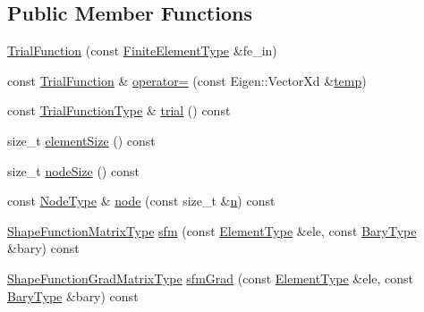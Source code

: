 \subsection*{Public Member Functions}
\begin{DoxyCompactItemize}
\item 
\hyperlink{classmodel_1_1_trial_function_ae27e9c128c6fca2c9a7e89b7b8e4849f}{Trial\+Function} (const \hyperlink{classmodel_1_1_trial_function_affdabe3315d0208c9b2210c3cbee6d42}{Finite\+Element\+Type} \&fe\+\_\+in)
\item 
const \hyperlink{classmodel_1_1_trial_function}{Trial\+Function} \& \hyperlink{classmodel_1_1_trial_function_abf1af5b4cf7edf2e9f1b054b6b196bdf}{operator=} (const Eigen\+::\+Vector\+Xd \&\hyperlink{tube_plotter_8m_a905c521e05ec8042631a912b71d0454e}{temp})
\item 
const \hyperlink{classmodel_1_1_trial_function_a7f044ad0cacd2e9026ea7a3861e0df9a}{Trial\+Function\+Type} \& \hyperlink{classmodel_1_1_trial_function_a08abf5dcf358fd9c2bd3539de7b08bb0}{trial} () const 
\item 
size\+\_\+t \hyperlink{classmodel_1_1_trial_function_af0da9e8374638daecd7cab1cc17ef35c}{element\+Size} () const 
\item 
size\+\_\+t \hyperlink{classmodel_1_1_trial_function_a19eaf6d59b64cde03e99d955a006483c}{node\+Size} () const 
\item 
const \hyperlink{classmodel_1_1_trial_function_abfb27d5003b203df9a1a34f81efb49c1}{Node\+Type} \& \hyperlink{classmodel_1_1_trial_function_ab3883213ccd18d9a11a285dfa80866c8}{node} (const size\+\_\+t \&\hyperlink{_f_e_m_2linear__elasticity__3d_2tetgen_2generate_p_o_l_ycube_8m_a74637fc31d6aedd6d61cdc0c8154bc13}{n}) const 
\item 
\hyperlink{classmodel_1_1_trial_function_aab74b7f4994594a049e4a0201ecd0770}{Shape\+Function\+Matrix\+Type} \hyperlink{classmodel_1_1_trial_function_a4b6a8fb90432c764dba5ebc45c4f0695}{sfm} (const \hyperlink{classmodel_1_1_trial_function_a72000c5b5030b4738f1d54f149519a78}{Element\+Type} \&ele, const \hyperlink{classmodel_1_1_trial_function_af4bd713419cc83660594065c9392bf2c}{Bary\+Type} \&bary) const 
\item 
\hyperlink{classmodel_1_1_trial_function_adf8d15a6967d142e4b5807db94294f66}{Shape\+Function\+Grad\+Matrix\+Type} \hyperlink{classmodel_1_1_trial_function_af4019d0b9c484b56b5572721f8581899}{sfm\+Grad} (const \hyperlink{classmodel_1_1_trial_function_a72000c5b5030b4738f1d54f149519a78}{Element\+Type} \&ele, const \hyperlink{classmodel_1_1_trial_function_af4bd713419cc83660594065c9392bf2c}{Bary\+Type} \&bary) const 

\end{DoxyCompactItemize}
